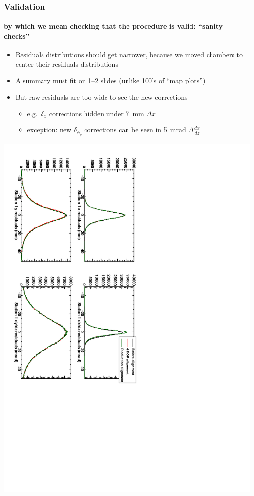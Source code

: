 \documentclass[compress]{beamer}
\begin{document}
\begin{frame}
\frametitle{Validation}
\framesubtitle{by which we mean checking that the procedure is valid: ``sanity checks''}

\begin{itemize}
\item Residuals distributions should get narrower, because we moved chambers to center their residuals distributions
\item A summary must fit on 1--2 slides (unlike 100's of ``map plots'')
\item But raw residuals are too wide to see the new corrections
\begin{itemize}\setlength{\itemsep}{0.1 cm}
\item e.g.\ $\delta_x$ corrections hidden under 7~mm $\Delta x$
\item exception: new $\delta_{\phi_y}$ corrections can be seen in 5~mrad $\Delta \frac{dx}{dz}$
\end{itemize}
\end{itemize}

\begin{center}
\includegraphics[height=0.8\linewidth, angle=90]{residuals_rawstation1.pdf}
\end{center}
\end{frame}
\end{document}
